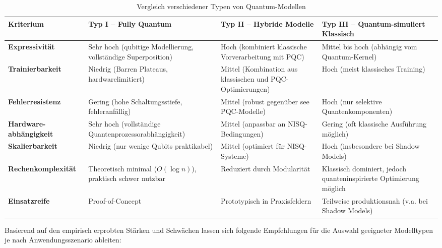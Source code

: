 \begin{table}[H]
\centering
\small
\renewcommand{\arraystretch}{1.4} %
\begin{tabular}{|>{\bfseries}m{2.5cm}|m{2.9cm}|m{2.9cm}|m{2.9cm}|}
\hline
Kriterium & Typ I – \textbf{Fully Quantum} & Typ II – \textbf{Hybride Modelle} & Typ III – \textbf{Quantum-simuliert Klassisch} \\
\hline
Expressivität & Sehr hoch (qubitige Modellierung, vollständige Superposition) & Hoch (kombiniert klassische Vorverarbeitung mit PQC) & Mittel bis hoch (abhängig vom Quantum-Kernel) \\
\hline
Trainierbarkeit & Niedrig (Barren Plateaus, hardwarelimitiert) & Mittel (Kombination aus klassischen und PQC-Optimierungen) & Hoch (meist klassisches Training) \\
\hline
Fehlerresistenz & Gering (hohe Schaltungsstiefe, fehleranfällig) & Mittel (robust gegenüber see PQC-Modelle) & Hoch (nur selektive Quantenkomponenten) \\
\hline
Hardware-
abhängigkeit & Sehr hoch (vollständige Quantenprozessorabhängigkeit) & Mittel (anpassbar an NISQ-Bedingungen) & Gering (oft klassische Ausführung möglich) \\
\hline
Skalierbarkeit & Niedrig (nur wenige Qubits praktikabel) & Mittel (optimiert für NISQ-Systeme) & Hoch (insbesondere bei Shadow Models) \\
\hline
Rechenkomplexität & Theoretisch minimal ($O(\log n)$), praktisch schwer nutzbar & Reduziert durch Modularität & Klassisch dominiert, jedoch quanteninspirierte Optimierung möglich \\
\hline
Einsatzreife & Proof-of-Concept & Prototypisch in Praxisfeldern & Teilweise produktionsnah (v.a. bei Shadow Models) \\
\hline
\end{tabular}
\caption{Vergleich verschiedener Typen von Quantum-Modellen}
\end{table}


Basierend auf den empirisch erprobten Stärken und Schwächen lassen sich folgende Empfehlungen für die Auswahl geeigneter Modelltypen je nach Anwendungsszenario ableiten:

